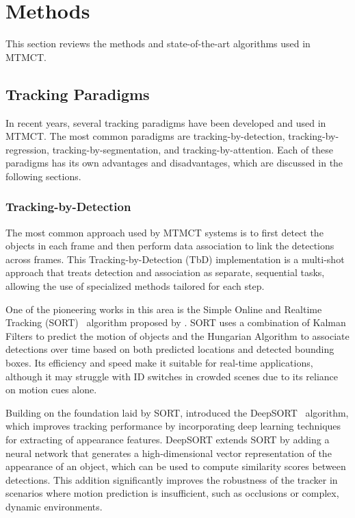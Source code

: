 \section{Methods}\label{sec:methods}
This section reviews the methods and state-of-the-art algorithms used in MTMCT.

\subsection{Tracking Paradigms}\label{subsec:tracking_paradigms}
In recent years, several tracking paradigms have been developed and used in MTMCT. The most common paradigms are tracking-by-detection, tracking-by-regression, tracking-by-segmentation, and tracking-by-attention. Each of these paradigms has its own advantages and disadvantages, which are discussed in the following sections.

\subsubsection{Tracking-by-Detection}\label{subsubsec:tracking-by-detection}
The most common approach used by MTMCT systems is to first detect the objects in each frame and then perform data association to link the detections across frames. This Tracking-by-Detection (TbD) implementation is a multi-shot approach that treats detection and association as separate, sequential tasks, allowing the use of specialized methods tailored for each step.

One of the pioneering works in this area is the Simple Online and Realtime Tracking (SORT)~\cite{Bewley16} algorithm proposed by \citeauthor{Bewley16}. SORT uses a combination of Kalman Filters to predict the motion of objects and the Hungarian Algorithm to associate detections over time based on both predicted locations and detected bounding boxes. Its efficiency and speed make it suitable for real-time applications, although it may struggle with ID switches in crowded scenes due to its reliance on motion cues alone.

Building on the foundation laid by SORT, \citeauthor{Wojke17} introduced the DeepSORT~\cite{Wojke17} algorithm, which improves tracking performance by incorporating deep learning techniques for extracting of appearance features. DeepSORT extends SORT by adding a neural network that generates a high-dimensional vector representation of the appearance of an object, which can be used to compute similarity scores between detections. This addition significantly improves the robustness of the tracker in scenarios where motion prediction is insufficient, such as occlusions or complex, dynamic environments.

